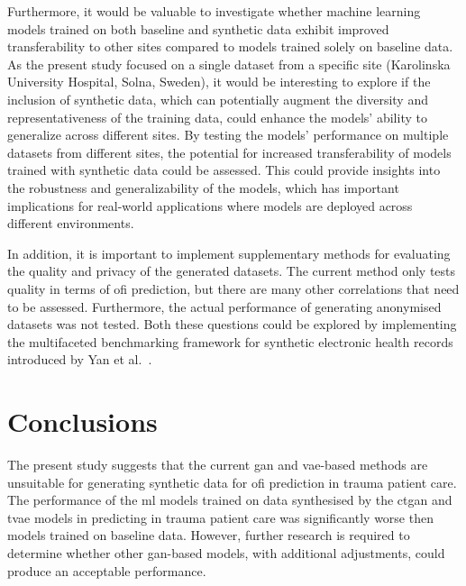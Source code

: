 \documentclass[12pt, a4paper]{article}
\begin{document}
Furthermore, it would be valuable to investigate whether machine learning models trained on both baseline and synthetic
data exhibit improved transferability to other sites compared to models trained solely on baseline data. As the present
study focused on a single dataset from a specific site (Karolinska University Hospital, Solna, Sweden), it would be
interesting to explore if the inclusion of synthetic data, which can potentially augment the diversity and
representativeness of the training data, could enhance the models' ability to generalize across different sites. By
testing the models' performance on multiple datasets from different sites, the potential for increased transferability
of models trained with synthetic data could be assessed. This could provide insights into the robustness and
generalizability of the models, which has important implications for real-world applications where models are deployed
across different environments.

In addition, it is important to implement supplementary methods for evaluating the quality and privacy of the generated
datasets. The current method only tests quality in terms of \acrshort{ofi} prediction, but there are many other
correlations that need to be assessed. Furthermore, the actual performance of generating anonymised datasets was not
tested. Both these questions could be explored by implementing the multifaceted benchmarking framework for synthetic
electronic health records introduced by Yan et al.~\cite{yan_multifaceted_2022}.

\section{Conclusions}
The present study suggests that the current \acrshort{gan} and \acrshort{vae}-based methods are unsuitable for
generating synthetic data for \acrshort{ofi} prediction in trauma patient care. The performance of the \acrshort{ml}
models trained on data synthesised by the \acrshort{ctgan} and \acrshort{tvae} models in predicting  in
trauma patient care was significantly worse then models trained on baseline data. However, further research is required
to determine whether other \acrshort{gan}-based models, with additional adjustments, could produce an acceptable
performance.

\newpage

\singlespacing

\printbibliography

\newpage
\end{document}
